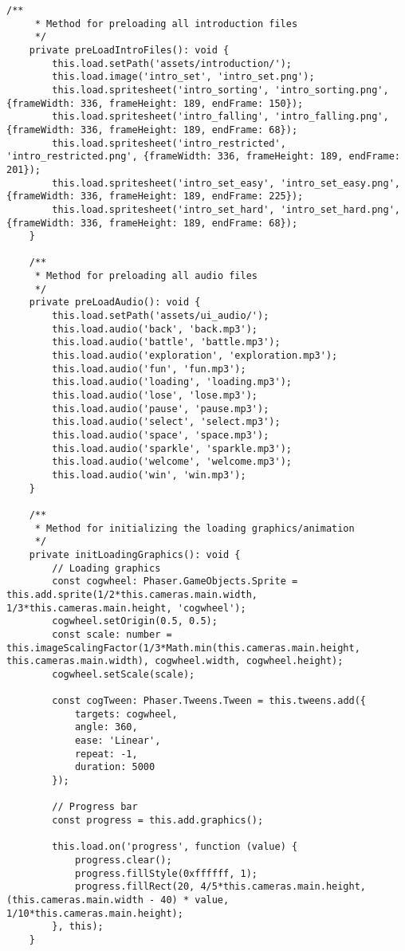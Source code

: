 \begin{lstlisting}[style=TypeScript, caption={preloadAsset.ts}]
    /**
     * Method for preloading all introduction files
     */
    private preLoadIntroFiles(): void {
        this.load.setPath('assets/introduction/');
        this.load.image('intro_set', 'intro_set.png');
        this.load.spritesheet('intro_sorting', 'intro_sorting.png', {frameWidth: 336, frameHeight: 189, endFrame: 150});
        this.load.spritesheet('intro_falling', 'intro_falling.png', {frameWidth: 336, frameHeight: 189, endFrame: 68});
        this.load.spritesheet('intro_restricted', 'intro_restricted.png', {frameWidth: 336, frameHeight: 189, endFrame: 201});
        this.load.spritesheet('intro_set_easy', 'intro_set_easy.png', {frameWidth: 336, frameHeight: 189, endFrame: 225});
        this.load.spritesheet('intro_set_hard', 'intro_set_hard.png', {frameWidth: 336, frameHeight: 189, endFrame: 68});
    }

    /**
     * Method for preloading all audio files
     */
    private preLoadAudio(): void {
        this.load.setPath('assets/ui_audio/');
        this.load.audio('back', 'back.mp3');
        this.load.audio('battle', 'battle.mp3');
        this.load.audio('exploration', 'exploration.mp3');
        this.load.audio('fun', 'fun.mp3');
        this.load.audio('loading', 'loading.mp3');
        this.load.audio('lose', 'lose.mp3');
        this.load.audio('pause', 'pause.mp3');
        this.load.audio('select', 'select.mp3');
        this.load.audio('space', 'space.mp3');
        this.load.audio('sparkle', 'sparkle.mp3');
        this.load.audio('welcome', 'welcome.mp3');
        this.load.audio('win', 'win.mp3');
    }

    /**
     * Method for initializing the loading graphics/animation
     */
    private initLoadingGraphics(): void {
        // Loading graphics
        const cogwheel: Phaser.GameObjects.Sprite = this.add.sprite(1/2*this.cameras.main.width, 1/3*this.cameras.main.height, 'cogwheel');
        cogwheel.setOrigin(0.5, 0.5);
        const scale: number = this.imageScalingFactor(1/3*Math.min(this.cameras.main.height, this.cameras.main.width), cogwheel.width, cogwheel.height);
        cogwheel.setScale(scale);

        const cogTween: Phaser.Tweens.Tween = this.tweens.add({
            targets: cogwheel,
            angle: 360,
            ease: 'Linear',
            repeat: -1,
            duration: 5000
        });

        // Progress bar
        const progress = this.add.graphics();

        this.load.on('progress', function (value) {
            progress.clear();
            progress.fillStyle(0xffffff, 1);
            progress.fillRect(20, 4/5*this.cameras.main.height, (this.cameras.main.width - 40) * value, 1/10*this.cameras.main.height);
        }, this);
    }


\end{lstlisting}

